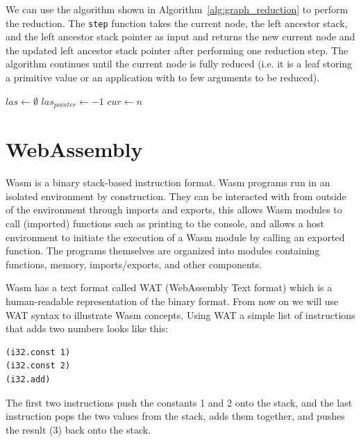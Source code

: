 We can use the algorithm shown in Algorithm~\ref{alg:graph_reduction} to perform the reduction. The \texttt{step} function takes the current node, the left ancestor stack, and the left ancestor stack pointer as input and returns the new current node and the updated left ancestor stack pointer after performing one reduction step. The algorithm continues until the current node is fully reduced (i.e. it is a leaf storing a primitive value or an application with to few arguments to be reduced).
\begin{algorithm}
  \caption{Graph reduction algorithm based on \cite{turner}.}
  \label{alg:graph_reduction}
  $las \gets \emptyset$\;
  $las_{pointer} \gets -1$\;
  $cur \gets n$\;
\end{algorithm}

\section{WebAssembly}\label{sec:background:wasm}
Wasm is a binary stack-based instruction format. Wasm programs run in an isolated environment by construction. They can be interacted with from outside of the environment through imports and exports, this allows Wasm modules to call (imported) functions such as printing to the console, and allows a host environment to initiate the execution of a Wasm module by calling an exported function. The programs themselves are organized into modules containing functions, memory, imports/exports, and other components.

Wasm has a text format called WAT (WebAssembly Text format) which is a human-readable representation of the binary format. From now on we will use WAT syntax to illustrate Wasm concepts. Using WAT a simple list of instructions that adds two numbers looks like this:
\begin{verbatim}
(i32.const 1)
(i32.const 2)
(i32.add)
\end{verbatim}
The first two instructions push the constants 1 and 2 onto the stack, and the last instruction pops the two values from the stack, adds them together, and pushes the result (3) back onto the stack.

